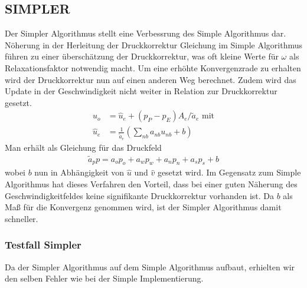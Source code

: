 \documentclass{article}
\begin{document}
\subsection{SIMPLER}
Der Simpler Algorithmus stellt eine Verbessrung des Simple Algorithmus dar. Nöherung in der Herleitung der Druckkorrektur Gleichung im
Simple Algorithmus führen zu einer überschätzung der Druckkorrektur, was oft kleine Werte für $\omega$ als Relaxationsfaktor 
notwendig macht.
Um eine erhöhte Konvergenzrade zu erhalten wird der Druckkorrektur nun auf einen anderen Weg berechnet.
Zudem wird das Update in der Geschwindigkeit nicht weiter in Relation zur Druckkorrektur gesetzt.
\begin{align}
u_o &= \hat{u}_e + (p_P-p_E)A_e/\tilde{a}_e \text{ mit}\\
\hat{u}_e &= \frac{1}{\tilde{a}_e}(\sum_{nb}a_{nb}u_{nb}+b)
\end{align}
Man erhält als Gleichung für das Druckfeld
\begin{align}
\tilde{a}_p p= a_o  p_o + a_w p_w +a_n  p_n +a_s  p_s +b
\end{align}
wobei $b$ nun in Abhängigkeit von $\hat{u}$ und $\hat{v}$ gesetzt wird.
Im Gegensatz zum Simple Algorithmus hat dieses Verfahren den Vorteil, dass bei einer guten Näherung des Geschwindigkeitfeldes
keine signifikante Druckkorrektur vorhanden ist. Da $b$ als Maß für die Konvergenz genommen wird, ist der Simpler Algorithmus damit
schneller.
\subsubsection{Testfall Simpler}
Da der Simpler Algorithmus auf dem Simple Algorithmus aufbaut, erhielten wir den selben Fehler wie bei der Simple Implementierung.
\end{document}
